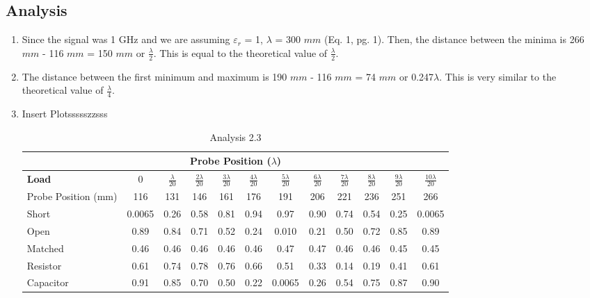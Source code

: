 \documentclass{article}
\begin{document}
\subsection{Analysis}
\begin{enumerate}
	\item Since the signal was 1 GHz and we are assuming $\varepsilon_r$ = 1, $\lambda$ = 300 $mm$ (Eq. 1, pg. 1). Then, the distance between the minima is 266 $mm$ - 116 $mm$ = 150 $mm$ or $\frac{\lambda}{2}$. This is equal to the theoretical value of $\frac{\lambda}{2}$.
	
	\item The distance between the first minimum and maximum is 190 $mm$ - 116 $mm$ = 74 $mm$ or 0.247$\lambda$. This is very similar to the theoretical value of $\frac{\lambda}{4}$.
	
	\item Insert Plotssssszzsss
	\begin{table}[h]
	\centering
		\begin{tabular}{|l|c|c|c|c|c|c|c|c|c|c|c|}
		\hline
		\multicolumn{12}{|c|}{\textbf{Probe Position ($\lambda$)}}                                                         		\\ \hline
		\textbf{Load}       & 0      & $\frac{\lambda}{20}$    & $\frac{2\lambda}{20}$    & $\frac{3\lambda}{20}$    & $\frac{4\lambda}{20}$    & $\frac{5\lambda}{20}$      & $\frac{6\lambda}{20}$    & $\frac{7\lambda}{20}$    & $\frac{8\lambda}{20}$    & $\frac{9\lambda}{20}$    & $\frac{10\lambda}{20}$     		\\ \hline
		Probe Position (mm) & 116    & 131  & 146  & 161  & 176  & 191    & 206  & 221  & 236  & 251  & 266    		\\ \hline
		Short               & 0.0065 & 0.26 & 0.58 & 0.81 & 0.94 & 0.97   & 0.90 & 0.74 & 0.54 & 0.25 & 0.0065 		\\ \hline
		Open                & 0.89   & 0.84 & 0.71 & 0.52 & 0.24 & 0.010  & 0.21 & 0.50 & 0.72 & 0.85 & 0.89   		\\ \hline
		Matched             & 0.46   & 0.46 & 0.46 & 0.46 & 0.46 & 0.47   & 0.47 & 0.46 & 0.46 & 0.45 & 0.45   		\\ \hline
		Resistor            & 0.61   & 0.74 & 0.78 & 0.76 & 0.66 & 0.51   & 0.33 & 0.14 & 0.19 & 0.41 & 0.61   		\\ \hline
		Capacitor           & 0.91   & 0.85 & 0.70 & 0.50 & 0.22 & 0.0065 & 0.26 & 0.54 & 0.75 & 0.87 & 0.90   		\\ \hline
		\end{tabular}
		\caption{Analysis 2.3}
		\label{}
	\end{table}
\end{enumerate}
\end{document}
